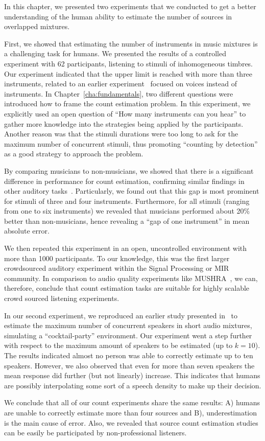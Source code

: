 In this chapter, we presented two experiments that we conducted to get a better understanding of the human ability to estimate the number of sources in overlapped mixtures.
\par
First, we showed that estimating the number of instruments in music mixtures is a challenging task for humans.
We presented the results of a controlled experiment with 62 participants, listening to stimuli of inhomogeneous timbres.
Our experiment indicated that the upper limit is reached with more than three instruments, related to an earlier experiment~\cite{huron89} focused on voices instead of instruments.
In Chapter~\ref{cha:fundamentals}, two different questions were introduced how to frame the count estimation problem.
In this experiment, we explicitly used an open question of ``How many instruments can you hear'' to gather more knowledge into the strategies being applied by the participants.
Another reason was that the stimuli durations were too long to ask for the maximum number of concurrent stimuli, thus promoting ``counting by detection'' as a good strategy to approach the problem.\par
By comparing musicians to non-musicians, we showed that there is a significant difference in performance for count estimation, confirming similar findings in other auditory tasks~\cite{kishon01}.
Particularly, we found out that this gap is most prominent for stimuli of three and four instruments.
Furthermore, for all stimuli (ranging from one to six instruments) we revealed that musicians performed about 20\% better than non-musicians, hence revealing a ``gap of one instrument'' in mean absolute error.
\par
We then repeated this experiment in an open, uncontrolled environment with more than 1000 participants.
To our knowledge, this was the first larger crowdsourced auditory experiment within the Signal Processing or MIR community.
In comparison to audio quality experiments like MUSHRA~\cite{recommendation2001MUSHRA}, we can, therefore, conclude that count estimation tasks are suitable for highly scalable crowd sourced listening experiments.
\par
In our second experiment, we reproduced an earlier study presented in~\cite{kawashima15} to estimate the maximum number of concurrent speakers in short audio mixtures, simulating a ``cocktail-party'' environment.
Our experiment went a step further with respect to the maximum amount of speakers to be estimated (up to \(k=10\)).
The results indicated almost no person was able to correctly estimate up to ten speakers.
However, we also observed that even for more than seven speakers the mean response did further (but not linearly) increase.
This indicates that humans are possibly interpolating some sort of a speech density to make up their decision.
\par
We conclude that all of our count experiments share the same results: A) humans are unable to correctly estimate more than four sources and B), underestimation is the main cause of error.
Also, we revealed that source count estimation studies can be easily be participated by non-professional listeners.